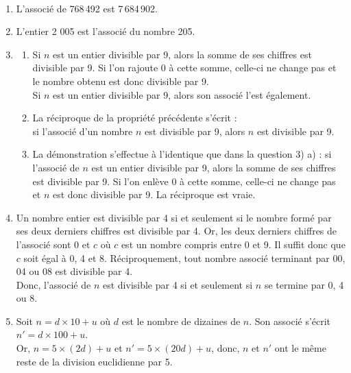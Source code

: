 \begin{corrige}
\ \\ [-5mm]
   \begin{enumerate}
      \item {\blue L'associé de 768\,492 est 7\,684\,902.}
      \item {\blue L'entier 2 005 est l'associé du nombre 205.}
      \item
         \begin{enumerate}
            \item Si $n$ est un entier divisible par 9, alors la somme de ses chiffres est divisible par 9. Si l'on rajoute 0 à cette somme, celle-ci ne change pas et le nombre obtenu est donc divisible par 9. \\
               {\blue Si $n$ est un entier divisible par 9, alors son associé l'est également.}
            \item La réciproque de la propriété précédente s'écrit : \\
               {\blue si l'associé d'un nombre $n$ est divisible par 9, alors $n$ est divisible par 9.}
             \item La démonstration s'effectue à l'identique que dans la question 3) a) : si l'associé de $n$ est un entier divisible par 9, alors la somme de ses chiffres est divisible par 9. Si l'on  enlève 0 à cette somme, celle-ci ne change pas et $n$ est donc divisible par 9. {\blue La réciproque est vraie.}
         \end{enumerate}
      \setcounter{enumi}{3}
      \item Un nombre entier est divisible par 4 si et seulement si le nombre formé par ses deux derniers chiffres est divisible par 4. Or, les deux derniers chiffres de l'associé sont 0 et $c$ où $c$ est un nombre compris entre 0 et 9. Il suffit donc que $c$ soit égal à 0, 4 et 8. Réciproquement, tout nombre associé terminant par 00, 04 ou 08 est divisible par 4. \\
         Donc, {\blue l'associé de $n$ est divisible par 4 si et seulement si $n$ se termine par 0, 4 ou 8.}
      \item Soit $n=d\times10+u$ où $d$ est le nombre de dizaines de $n$. Son associé s'écrit $n'=d\times100+u$. \\
         Or, $n=5\times(2d)+u$ et $n'=5\times(20d)+u$, donc, {\blue $n$ et $n'$ ont le même reste de la division euclidienne par 5.}
   \end{enumerate}
\end{corrige}


